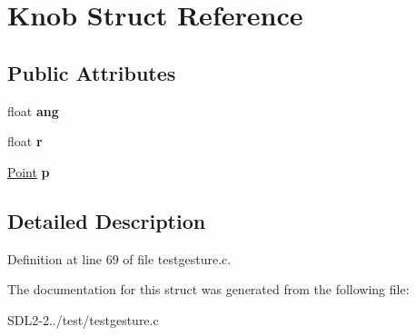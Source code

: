 \hypertarget{structKnob}{\section{Knob Struct Reference}
\label{structKnob}
}
\subsection*{Public Attributes}
\begin{DoxyCompactItemize}
\item 
\hypertarget{structKnob_a030d68426750322c24409d4c88504d25}{float {\bfseries ang}}\label{structKnob_a030d68426750322c24409d4c88504d25}

\item 
\hypertarget{structKnob_a380ea778571da22f6e94f870a3f74a02}{float {\bfseries r}}\label{structKnob_a380ea778571da22f6e94f870a3f74a02}

\item 
\hypertarget{structKnob_ac445bc23490fc67bbb13725af6e3d9c3}{\hyperlink{structPoint}{Point} {\bfseries p}}\label{structKnob_ac445bc23490fc67bbb13725af6e3d9c3}

\end{DoxyCompactItemize}


\subsection{Detailed Description}


Definition at line 69 of file testgesture.\+c.



The documentation for this struct was generated from the following file\+:\begin{DoxyCompactItemize}
\item 
S\+D\+L2-\/2../test/testgesture.\+c\end{DoxyCompactItemize}
